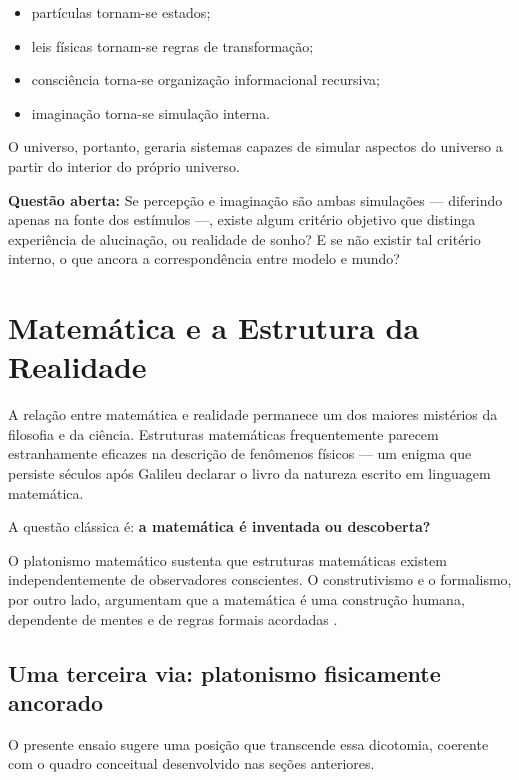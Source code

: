 \documentclass[12pt,a4paper]{article}
\begin{document}
\begin{itemize}
  \item partículas tornam-se estados;
  \item leis físicas tornam-se regras de transformação;
  \item consciência torna-se organização informacional recursiva;
  \item imaginação torna-se simulação interna.
\end{itemize}

O universo, portanto, geraria sistemas capazes de simular aspectos do
universo a partir do interior do próprio universo.

\begin{tcolorbox}[questionbox]
  \textbf{Questão aberta:} Se percepção e imaginação são ambas simulações —
  diferindo apenas na fonte dos estímulos —, existe algum critério objetivo
  que distinga experiência de alucinação, ou realidade de sonho?
  E se não existir tal critério interno, o que ancora a correspondência
  entre modelo e mundo?
\end{tcolorbox}

\section{Matemática e a Estrutura da Realidade}

A relação entre matemática e realidade permanece um dos maiores mistérios
da filosofia e da ciência. Estruturas matemáticas frequentemente parecem
estranhamente eficazes na descrição de fenômenos físicos \citep{wigner1960}
— um enigma que persiste séculos após Galileu declarar o livro da natureza
escrito em linguagem matemática.

A questão clássica é: \textbf{a matemática é inventada ou descoberta?}

O platonismo matemático \citep{balaguer2016} sustenta que estruturas
matemáticas existem independentemente de observadores conscientes.
O construtivismo e o formalismo, por outro lado, argumentam que a
matemática é uma construção humana, dependente de mentes e de regras
formais acordadas \citep{hilbert1926}.

\subsection{Uma terceira via: platonismo fisicamente ancorado}

O presente ensaio sugere uma posição que transcende essa dicotomia,
coerente com o quadro conceitual desenvolvido nas seções anteriores.
\end{document}
